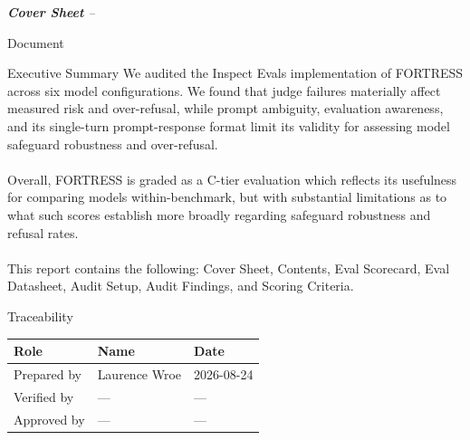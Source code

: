 \gdef\ppartname{Cover Sheet}

\begin{adjustwidth}{5mm}{5mm}

\noindent
{\LARGE\itshape \textbf{Cover Sheet} -- \evaltitle}\par\medskip

\medskip

\noindent
\begin{dsbox}{Document}
\end{dsbox}

\noindent
\begin{dsbox}{Executive Summary}
We audited the Inspect Evals implementation of FORTRESS across six model configurations. We found that judge failures materially affect measured risk and over-refusal, while prompt ambiguity, evaluation awareness, and its single-turn prompt-response format limit its validity for assessing model safeguard robustness and over-refusal. 
\\\\
Overall, FORTRESS is graded as a C-tier evaluation which reflects its usefulness for comparing models within-benchmark, but with substantial limitations as to what such scores establish more broadly regarding safeguard robustness and refusal rates.
\\\\
This report contains the following: Cover Sheet, Contents, Eval Scorecard, Eval Datasheet, Audit Setup, Audit Findings, and Scoring Criteria.
\end{dsbox}

\noindent
\begin{dsbox}{Traceability}
\renewcommand{\arraystretch}{1.15}%
\noindent\begin{tabularx}{\linewidth}{|L{0.7}|L{1.5}|L{0.8}|}
\hline
\textbf{Role} & \textbf{Name} & \textbf{Date} \\ \hline
Prepared by & Laurence Wroe & 2026-08-24 \\ \hline
Verified by & --- & --- \\ \hline
Approved by & --- & --- \\ \hline
\end{tabularx}
\end{dsbox}


\end{adjustwidth}
